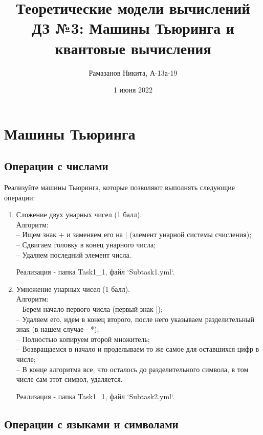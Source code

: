 \documentclass{article}
\title{Теоретические модели вычислений \\
ДЗ №3: Машины Тьюринга и квантовые вычисления}
\author{Рамазанов Никита, А-13а-19}
\date{1 июня 2022}
\begin{document}
\maketitle


\section{Машины Тьюринга}

\subsection{Операции с числами}

Реализуйте машины Тьюринга, которые позволяют выполнять следующие операции:
\begin{enumerate}
    \item Сложение двух унарных чисел (1 балл).\\
    Алгоритм:\\
    -- Ищем знак + и заменяем его на | (элемент унарной системы счисления);\\
    -- Сдвигаем головку в конец унарного числа;\\
    -- Удаляем последний элемент числа.
    
    Реализация - папка Task1\_1, файл `Subtask1.yml`.
    
    \item Умножение унарных чисел (1 балл).\\
    Алгоритм: \\
    -- Берем начало первого числа (первый знак |);\\
    -- Удаляем его, идем в конец второго, после него указываем разделительный знак (в нашем случае - *);\\
    -- Полностью копируем второй множитель;\\
    -- Возвращаемся в начало и проделываем то же самое для оставшихся цифр в числе;\\
    -- В конце алгоритма все, что осталось до разделительного символа, в том числе сам этот символ, удаляется.
    
    Реализация - папка Task1\_1, файл `Subtask2.yml`.
    
\end{enumerate}


\subsection{Операции с языками и символами}
\end{document}
